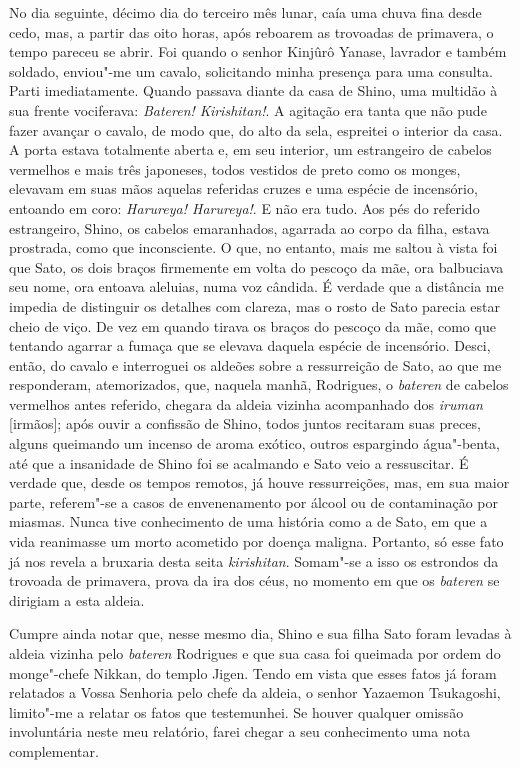 No dia seguinte, décimo dia do terceiro mês lunar, caía uma chuva fina
desde cedo, mas, a partir das oito horas, após reboarem as trovoadas de
primavera, o tempo pareceu se abrir. Foi quando o senhor Kinjûrô Yanase, 
lavrador e também soldado, enviou"-me um cavalo, solicitando
minha presença para uma consulta. Parti imediatamente. Quando passava
diante da casa de Shino, uma multidão à sua frente vociferava:
\textit{Bateren! Kirishitan!}. A agitação era tanta que não pude
fazer avançar o cavalo, de modo que, do alto da sela, espreitei o
interior da casa. A porta estava totalmente aberta e, em seu interior,
um estrangeiro de cabelos vermelhos e mais três japoneses, todos
vestidos de preto como os monges, elevavam em suas mãos aquelas
referidas cruzes e uma espécie de incensório, entoando em coro:
\textit{Harureya! Harureya!}. E não era tudo. Aos pés do referido
estrangeiro, Shino, os cabelos emaranhados, agarrada ao corpo da filha,
estava prostrada, como que inconsciente. O que, no entanto, mais me
saltou à vista foi que Sato, os dois braços firmemente em volta do
pescoço da mãe, ora balbuciava seu nome, ora entoava aleluias, numa voz
cândida. É verdade que a distância me impedia de distinguir os detalhes
com clareza, mas o rosto de Sato parecia estar cheio de viço. De vez em
quando tirava os braços do pescoço da mãe, como que tentando agarrar a
fumaça que se elevava daquela espécie de incensório. Desci, então, do
cavalo e interroguei os aldeões sobre a ressurreição de Sato, ao que me
responderam, atemorizados, que, naquela manhã, Rodrigues, o
\textit{bateren} de cabelos vermelhos antes referido, chegara da aldeia
vizinha acompanhado dos \textit{iruman} [irmãos]; 
após ouvir a confissão de Shino, todos juntos recitaram
suas preces, alguns queimando um incenso de aroma exótico, outros
espargindo água"-benta, até que a insanidade de Shino foi se acalmando e
Sato veio a ressuscitar. É verdade que, desde os tempos remotos, já
houve ressurreições, mas, em sua maior parte, referem"-se a casos de
envenenamento por álcool ou de contaminação por miasmas. Nunca tive
conhecimento de uma história como a de Sato, em que a vida reanimasse
um morto acometido por doença maligna. Portanto, só esse fato já nos
revela a bruxaria desta seita \textit{kirishitan}. Somam"-se a isso os
estrondos da trovoada de primavera, prova da ira dos céus, no momento
em que os \textit{bateren} se dirigiam a esta aldeia.

Cumpre ainda notar que, nesse mesmo dia, Shino e sua filha Sato foram
levadas à aldeia vizinha pelo \textit{bateren} Rodrigues e que sua casa
foi queimada por ordem do monge"-chefe Nikkan, do templo Jigen. Tendo em
vista que esses fatos já foram relatados a Vossa Senhoria pelo chefe da
aldeia, o senhor Yazaemon Tsukagoshi, limito"-me a relatar os fatos que
testemunhei. Se houver qualquer omissão involuntária neste meu
relatório, farei chegar a seu conhecimento uma nota complementar.

